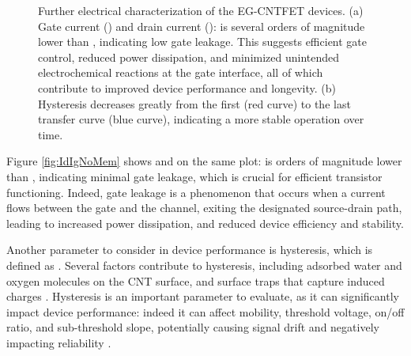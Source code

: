 \begin{figure}
    \centering
    \quad
    \caption{Further electrical characterization of the EG-CNTFET devices. 
    (a) Gate current (\igs{}) and drain current (\ids{}): \igs{} is several orders of magnitude lower than \ids{}, indicating low gate leakage. This suggests efficient gate control, reduced power dissipation, and minimized unintended electrochemical reactions at the gate interface, all of which contribute to improved device performance and longevity. 
    (b) Hysteresis decreases greatly from the first (red curve) to the last transfer curve (blue curve), indicating a more stable operation over time.}
    \label{fig:parameters_noMem}
\end{figure}

Figure \ref{fig:IdIgNoMem} shows \ids{} and \igs{} on the same plot: \igs{} is orders of magnitude lower than \ids{}, indicating minimal gate leakage, which is crucial for efficient transistor functioning. Indeed, gate leakage is a phenomenon that occurs when a current flows between the gate and the channel, exiting the designated source-drain path, leading to increased power dissipation, and reduced device efficiency and stability.

Another parameter to consider in device performance is hysteresis, which is defined as  \citep{joshiUnderstanding2018}. Several factors contribute to hysteresis, including adsorbed water and oxygen molecules on the CNT surface, and surface traps that capture induced charges \citep{joshiUnderstanding2018,zaumseilSemiconducting2019}. Hysteresis is an important parameter to evaluate, as it can significantly impact device performance: indeed it can affect mobility, threshold voltage, on/off ratio, and sub-threshold slope, potentially causing signal drift and negatively impacting reliability \citep{joshiUnderstanding2018,noyceElectronic2019}.

